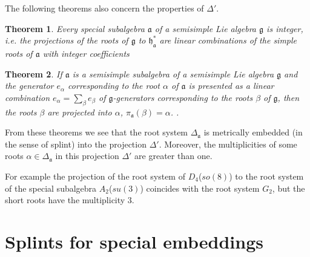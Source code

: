 \documentclass[12pt]{article}
\newtheorem{theorem}{Theorem}
\newcommand{\pia}{\pi_{\mathfrak{a}}}
\newcommand{\gf}{\mathfrak{g}}
\newcommand{\af}{\mathfrak{a}}
\newcommand{\hf}{\mathfrak{h}}
\newcommand{\hfa}{\hf_{\af}}
\begin{document}
The following theorems \cite{dynkin1952semisimple} also concern the properties of $\Delta'$. 

\begin{theorem}\label{dyn1}
  Every special subalgebra $\af$ of a semisimple Lie algebra $\gf$ is integer, i.e. the projections of
  the roots of $\gf$ to $\hfa^{*}$ are linear combinations of the simple roots of $\af$ with integer
  coefficients \cite{dynkin1952semisimple}
\end{theorem}

\begin{theorem}\label{dyn2}
  If $\af$  is a semisimple subalgebra of a semisimple Lie algebra $\gf$ and the generator $e_{\alpha}$ corresponding to
  the root $\alpha$ of $\af$ is presented as a linear combination $e_{\alpha}=\sum_{\beta}
  e_{\beta}$ of $\gf$-generators
  corresponding to the roots $\beta$ of $\gf$, then the roots $\beta$ are projected into $\alpha$,
  $\pia(\beta)=\alpha$. 
  \cite{dynkin1972semisimple,dynkin1952semisimple}. 
\end{theorem}

From these theorems we see that the root system $\Delta_{\af}$ is metrically embedded (in the sense
of splint) into the projection $\Delta'$. Moreover, the multiplicities of some roots
$\alpha\in\Delta_{\af}$ in this projection $\Delta'$ are greater than one. 

For example the projection of the root system of $D_{4}$($so(8)$) to the root system of the special
subalgebra $A_{2}$($su(3)$) coincides with the root system $G_{2}$, but the short roots have the multiplicity $3$.



\section{Splints for special embeddings}
\label{sec:splints-spec-embedd}

\end{document}
